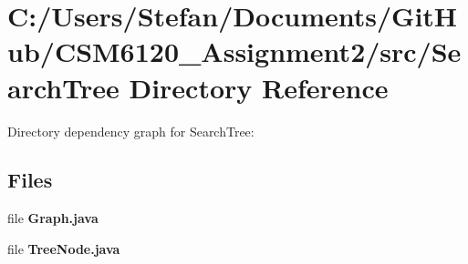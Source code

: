 \section{C\+:/\+Users/\+Stefan/\+Documents/\+Git\+Hub/\+C\+S\+M6120\+\_\+\+Assignment2/src/\+Search\+Tree Directory Reference}
\label{dir_e1b541442b5a80c135deed6082c8a1f8}
Directory dependency graph for Search\+Tree\+:
\subsection*{Files}
\begin{DoxyCompactItemize}
\item 
file {\bfseries Graph.\+java}
\item 
file {\bfseries Tree\+Node.\+java}
\end{DoxyCompactItemize}
